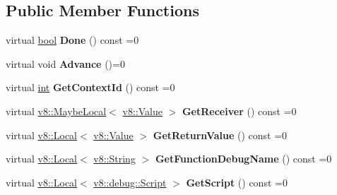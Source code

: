 \subsection*{Public Member Functions}
\begin{DoxyCompactItemize}
\item 
\mbox{\label{classv8_1_1debug_1_1StackTraceIterator_a62a12d12e464df11c9385eb287ae33f2}} 
virtual \mbox{\hyperlink{classbool}{bool}} {\bfseries Done} () const =0
\item 
\mbox{\label{classv8_1_1debug_1_1StackTraceIterator_a6442dea1358831f7026b19f97b7d03d3}} 
virtual void {\bfseries Advance} ()=0
\item 
\mbox{\label{classv8_1_1debug_1_1StackTraceIterator_aaeaf4af8474599537dfe9f19af6f4cd9}} 
virtual \mbox{\hyperlink{classint}{int}} {\bfseries Get\+Context\+Id} () const =0
\item 
\mbox{\label{classv8_1_1debug_1_1StackTraceIterator_a8ab47dc7fc4bbdb9c16df4ff285869a8}} 
virtual \mbox{\hyperlink{classv8_1_1MaybeLocal}{v8\+::\+Maybe\+Local}}$<$ \mbox{\hyperlink{classv8_1_1Value}{v8\+::\+Value}} $>$ {\bfseries Get\+Receiver} () const =0
\item 
\mbox{\label{classv8_1_1debug_1_1StackTraceIterator_a03279339fca821c3049f5e1ca3a74170}} 
virtual \mbox{\hyperlink{classv8_1_1Local}{v8\+::\+Local}}$<$ \mbox{\hyperlink{classv8_1_1Value}{v8\+::\+Value}} $>$ {\bfseries Get\+Return\+Value} () const =0
\item 
\mbox{\label{classv8_1_1debug_1_1StackTraceIterator_a1f4e326e22ae3d741170d9a5a1474f21}} 
virtual \mbox{\hyperlink{classv8_1_1Local}{v8\+::\+Local}}$<$ \mbox{\hyperlink{classv8_1_1String}{v8\+::\+String}} $>$ {\bfseries Get\+Function\+Debug\+Name} () const =0
\item 
\mbox{\label{classv8_1_1debug_1_1StackTraceIterator_a6e5279300c69091376459a1d5fd1b366}} 
virtual \mbox{\hyperlink{classv8_1_1Local}{v8\+::\+Local}}$<$ \mbox{\hyperlink{classv8_1_1debug_1_1Script}{v8\+::debug\+::\+Script}} $>$ {\bfseries Get\+Script} () const =0

\end{DoxyCompactItemize}
